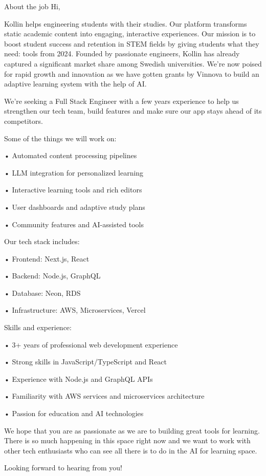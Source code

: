 About the job
Hi,



Kollin helps engineering students with their studies. Our platform transforms static academic content into engaging, interactive experiences. Our mission is to boost student success and retention in STEM fields by giving students what they need: tools from 2024. Founded by passionate engineers, Kollin has already captured a significant market share among Swedish universities. We're now poised for rapid growth and innovation as we have gotten grants by Vinnova to build an adaptive learning system with the help of AI.



We're seeking a Full Stack Engineer with a few years experience to help us strengthen our tech team, build features and make sure our app stays ahead of its competitors.



Some of the things we will work on:

• Automated content processing pipelines

• LLM integration for personalized learning

• Interactive learning tools and rich editors

• User dashboards and adaptive study plans

• Community features and AI-assisted tools



Our tech stack includes:

• Frontend: Next.js, React

• Backend: Node.js, GraphQL

• Database: Neon, RDS

• Infrastructure: AWS, Microservices, Vercel



Skills and experience:

• 3+ years of professional web development experience

• Strong skills in JavaScript/TypeScript and React

• Experience with Node.js and GraphQL APIs

• Familiarity with AWS services and microservices architecture

• Passion for education and AI technologies



We hope that you are as passionate as we are to building great tools for learning. There is so much happening in this space right now and we want to work with other tech enthusiasts who can see all there is to do in the AI for learning space.



Looking forward to hearing from you!